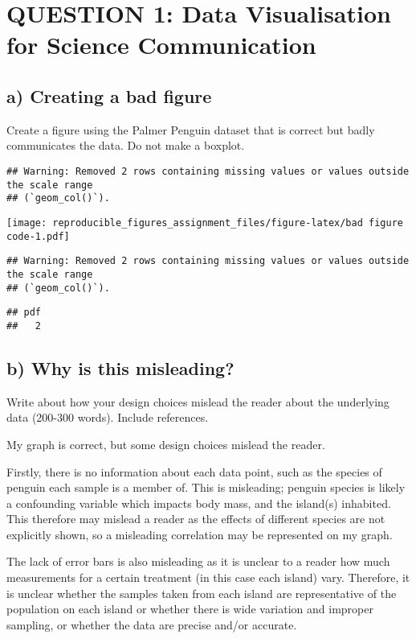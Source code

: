 \documentclass[
]{article}
\begin{document}
\section{QUESTION 1: Data Visualisation for Science
Communication}\label{question-1-data-visualisation-for-science-communication}

\subsection{a) Creating a bad figure}\label{a-creating-a-bad-figure}

Create a figure using the Palmer Penguin dataset that is correct but
badly communicates the data. Do not make a boxplot.

\begin{verbatim}
## Warning: Removed 2 rows containing missing values or values outside the scale range
## (`geom_col()`).
\end{verbatim}

\texttt{[image: reproducible\_figures\_assignment\_files/figure-latex/bad figure code-1.pdf]}

\begin{verbatim}
## Warning: Removed 2 rows containing missing values or values outside the scale range
## (`geom_col()`).
\end{verbatim}

\begin{verbatim}
## pdf 
##   2
\end{verbatim}

\subsection{b) Why is this misleading?}\label{b-why-is-this-misleading}

Write about how your design choices mislead the reader about the
underlying data (200-300 words). Include references.

My graph is correct, but some design choices mislead the reader.

Firstly, there is no information about each data point, such as the
species of penguin each sample is a member of. This is misleading;
penguin species is likely a confounding variable which impacts body
mass, and the island(s) inhabited. This therefore may mislead a reader
as the effects of different species are not explicitly shown, so a
misleading correlation may be represented on my graph.

The lack of error bars is also misleading as it is unclear to a reader
how much measurements for a certain treatment (in this case each island)
vary. Therefore, it is unclear whether the samples taken from each
island are representative of the population on each island or whether
there is wide variation and improper sampling, or whether the data are
precise and/or accurate.
\end{document}
